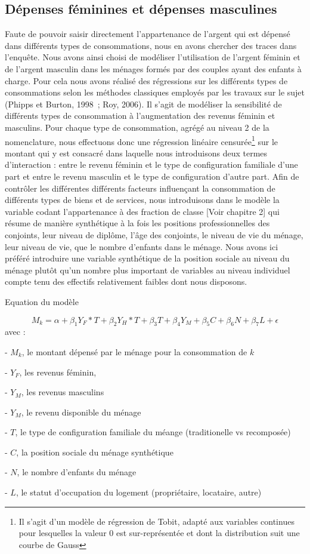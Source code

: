 \documentclass[
  12pt,
]{book}
\begin{document}
\subsection{Dépenses féminines et dépenses
masculines}\label{duxe9penses-fuxe9minines-et-duxe9penses-masculines}

Faute de pouvoir saisir directement l'appartenance de l'argent qui est
dépensé dans différents types de consommations, nous en avons chercher
des traces dans l'enquête. Nous avons ainsi choisi de modéliser
l'utilisation de l'argent féminin et de l'argent masculin dans les
ménages formés par des couples ayant des enfants à charge. Pour cela
nous avons réalisé des régressions sur les différents types de
consommations selon les méthodes classiques employés par les travaux sur
le sujet (Phipps et Burton, 1998~; Roy, 2006). Il s'agit de modéliser la
sensibilité de différents types de consommation à l'augmentation des
revenus féminin et masculins. Pour chaque type de consommation, agrégé
au niveau 2 de la nomenclature, nous effectuons donc une régression
linéaire censurée\footnote{Il s'agit d'un modèle de régression de Tobit,
  adapté aux variables continues pour lesquelles la valeur 0 est
  sur-représentée et dont la distribution suit une courbe de Gauss} sur
le montant qui y est consacré dans laquelle nous introduisons deux
termes d'interaction : entre le revenu féminin et le type de
configuration familiale d'une part et entre le revenu masculin et le
type de configuration d'autre part. Afin de contrôler les différentes
différents facteurs influençant la consommation de différents types de
biens et de services, nous introduisons dans le modèle la variable
codant l'appartenance à des fraction de classe {[}Voir chapitre 2{]} qui
résume de manière synthétique à la fois les positions professionnelles
des conjoints, leur niveau de diplôme, l'âge des conjoints, le niveau de
vie du ménage, leur niveau de vie, que le nombre d'enfants dans le
ménage. Nous avons ici préféré introduire une variable synthétique de la
position sociale au niveau du ménage plutôt qu'un nombre plus important
de variables au niveau individuel compte tenu des effectifs relativement
faibles dont nous disposons.

\begin{encadre}{Equation du modèle}

$$
M_k = \alpha + \beta_1 Y_F*T + \beta_2 Y_H*T + \beta_3 T + \beta_4 Y_M + \beta_5 C + \beta_6 N + \beta_7 L + \epsilon
$$
avec : 

- $M_k$, le montant dépensé par le ménage pour la consommation de $k$

- $Y_F$, les revenus féminin, 

- $Y_M$, les revenus masculins

- $Y_M$, le revenu disponible du ménage

- $T$, le type de configuration familiale du méange (traditionelle vs recomposée)

- $C$, la position sociale du ménage synthétique

- $N$, le nombre d'enfants du ménage

- $L$, le statut d'occupation du logement (propriétaire, locataire, autre)

\end{encadre}
\end{document}
